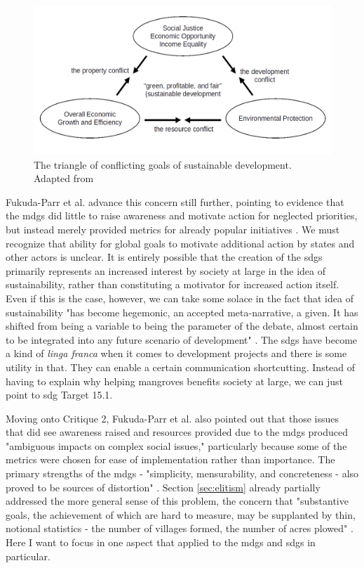 \begin{figure}[!htb]
	\centering
	\includegraphics[scale=0.35]{Figures/chap2/sustainable_triangle.png}
	\caption[The triangle of conflicting goals of sustainable development]{The triangle of conflicting goals of sustainable development. Adapted from \cite{campbellGreenCitiesGrowing2016}}
	\label{fig:sustainable_triangle}
\end{figure}

Fukuda-Parr et al. advance this concern still further, pointing to evidence that the \acp{mdg} did little to raise awareness and motivate action for neglected priorities, but instead merely provided metrics for already popular initiatives \cite{fukuda-parrPowerNumbersCritical2014}. We must recognize that ability for global goals to motivate additional action by states and other actors is unclear. It is entirely possible that the creation of the \acp{sdg} primarily represents an increased interest by society at large in the idea of sustainability, rather than constituting a motivator for increased action itself. Even if this is the case, however, we can take some solace in the fact that idea of sustainability "has become hegemonic, an accepted meta-narrative, a given. It has shifted from being a variable to being the parameter of the debate, almost certain to be integrated into any future scenario of development" \cite{campbellGreenCitiesGrowing2016}. The \acp{sdg} have become a kind of \textit{linga franca} when it comes to development projects and there is some utility in that. They can enable a certain communication shortcutting. Instead of having to explain why helping mangroves benefits society at large, we can just point to \ac{sdg} Target 15.1.

Moving onto Critique 2, Fukuda-Parr et al. also pointed out that those issues that did see awareness raised and resources provided due to the \acp{mdg} produced "ambiguous impacts on complex social issues," particularly because some of the metrics were chosen for ease of implementation rather than importance. The primary strengths of the \acp{mdg} - "simplicity, mensurability, and concreteness - also proved to be sources of distortion" \cite{fukuda-parrPowerNumbersCritical2014}. Section \ref{sec:elitism} already partially addressed the more general sense of this problem, the concern that "substantive goals, the achievement of which are hard to measure, may be supplanted by thin, notional statistics - the number of villages formed, the number of acres plowed" \cite{scottSeeingStateHow2020}. Here I want to focus in one aspect that applied to the \acp{mdg} and \acp{sdg} in particular. 
 
